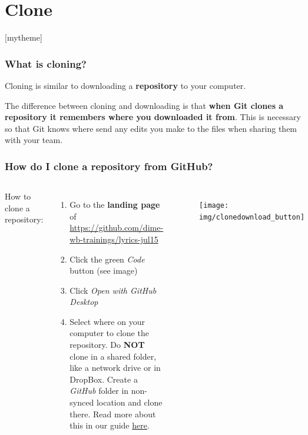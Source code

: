 \documentclass[aspectratio=169]{beamer}
\newcommand{\sectionpic}[2]{
	\section{#1}
	\setbeamertemplate{section page}[mytheme]
}
\newcommand{\trainingURL}[1]{{\color{blue}\url{#1}}}
\newcommand{\traininerUsername}{dime-wb-trainings}
\newcommand{\repoName}{\traininerUsername/lyrics-jul15}
\newcommand{\trainingRepoURL}{\href{https://github.com/\repoName}{\trainingURL{https://github.com/\repoName}}}
\begin{document}
\sectionpic{Clone}{}

\begin{frame}
\frametitle{What is cloning?}

	Cloning is similar to downloading a \textbf{repository} to your computer.

	\vspace{.5cm}

	The difference between cloning and downloading is that \textbf{when Git clones a repository it remembers where you downloaded it from}. This is necessary so that Git knows where send any edits you make to the files when sharing them with your team.

\end{frame}

\begin{frame}
\frametitle{How do I clone a repository from GitHub?}

	\begin{columns}[c]

		How to clone a repository:
		\begin{enumerate}
			\item Go to the \textbf{landing page} of \trainingRepoURL{}
			\item Click the green \textit{Code} button (see image)
			\item Click \textit{Open with GitHub Desktop}
			\item Select where on your computer to clone the repository. Do \textbf{NOT} clone in a shared folder, like a network drive or in DropBox. Create a \textit{GitHub} folder in non-synced location and clone there. Read more about this in our guide {\color{blue}\href{https://github.com/worldbank/dime-github-trainings/blob/master/GitHub-resources/DIME-GitHub-Guides/clone-location.md}{here}}.
		\end{enumerate}

		\begin{figure}
			\centering
			\texttt{[image: img/clonedownload\_button]}
			\label{fig:clonedownloadbutton}
		\end{figure}

	\end{columns}

\end{frame}
\end{document}
